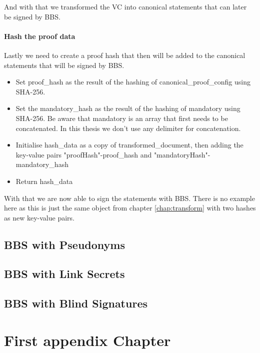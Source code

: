 \documentclass[
	a4paper               %
	,bibliography=totoc   %
	,listof=totoc         %
	,monolingual
	twoside=false,
]{bfhthesis}              %
\begin{document}
And with that we transformed the VC into canonical statements that can later be signed by BBS.

\subsubsection{Hash the proof data}

Lastly we need to create a proof hash that then will be added to the canonical statements that will be signed by BBS.

\begin{itemize}
	\item Set proof\_hash as the result of the hashing of canonical\_proof\_config using SHA-256.
	\item Set the mandatory\_hash as the result of the hashing of mandatory using SHA-256. Be aware that mandatory is an array that first needs to be concatenated. In this thesis we don't use any delimiter for concatenation. 
	\item Initialise hash\_data as a copy of transformed\_document, then adding the key-value pairs "proofHash"-proof\_hash and "mandatoryHash"-mandatory\_hash
	\item Return hash\_data
\end{itemize}

With that we are now able to sign the statements with BBS.
There is no example here as this is just the same object from chapter \ref{chap:transform} with two hashes as new key-value pairs.

\section{BBS with Pseudonyms}
\label{chap:Pseudonyms}

\section{BBS with Link Secrets}
\label{chap:linksecrets}

\section{BBS with Blind Signatures}
\label{chap:blindsignatures}




\appendix

\chapter{First appendix Chapter}





\end{document}
